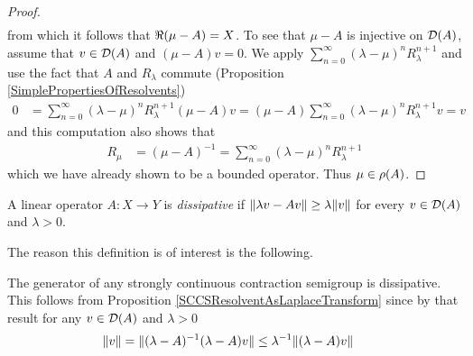 \begin{proof}
\begin{align*}
\end{align*}
from which it follows that $\Re(\mu - A) = X$.  To see that $\mu - A$ is injective on $\mathcal{D}(A)$, assume that $v \in \mathcal{D}(A)$ and  $(\mu - A) v = 0$.   We
apply $\sum_{n=0}^\infty  (\lambda - \mu)^n R_\lambda^{n+1}$ and use the fact that $A$ and $R_\lambda$ commute (Proposition \ref{SimplePropertiesOfResolvents})
\begin{align*}
0 &=\sum_{n=0}^\infty  (\lambda - \mu)^n R_\lambda^{n+1}  (\mu - A)  v =  (\mu - A)  \sum_{n=0}^\infty  (\lambda - \mu)^n R_\lambda^{n+1} v = v
\end{align*}
and this computation also shows that 
\begin{align*}
R_\mu &= (\mu-A)^{-1} = \sum_{n=0}^\infty  (\lambda - \mu)^n R_\lambda^{n+1}
\end{align*}
which we have already shown to be a bounded operator.  Thus $\mu \in \rho(A)$.
\end{proof}

\begin{defn}A linear operator $A : X \to Y$ is \emph{dissipative} if $\lVert \lambda v - A v \rVert \geq \lambda \lVert v \rVert$ for every $v \in \mathcal{D}(A)$ and $\lambda>0$.
\end{defn}

The reason this definition is of interest is the following.
\begin{examp}\label{SCCSGeneratorDissipative}The generator of any strongly continuous contraction semigroup is dissipative. This follows from Proposition \ref{SCCSResolventAsLaplaceTransform} since by that result for any $v \in \mathcal{D}(A)$ and $\lambda > 0$ 
\begin{align*}
\lVert v \rVert &= \lVert (\lambda - A)^{-1} (\lambda -A) v \rVert \leq \lambda^{-1} \lVert (\lambda -A) v \rVert 
\end{align*}
\end{examp}

